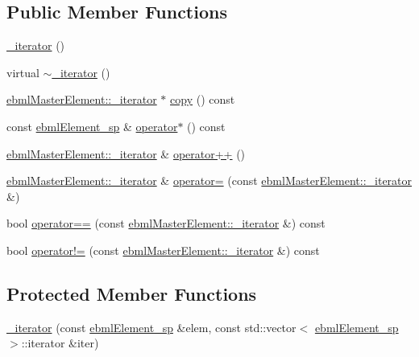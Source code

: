 \subsection*{Public Member Functions}
\begin{DoxyCompactItemize}
\item 
\mbox{\hyperlink{classebml_1_1ebmlList_1_1__iterator_a5a1d3e19e8cc65dd7e298fb289b6eaa2}{\+\_\+iterator}} ()
\item 
virtual \mbox{\hyperlink{classebml_1_1ebmlList_1_1__iterator_ac9b20864cf56e1cf7767153ec53eefc0}{$\sim$\+\_\+iterator}} ()
\item 
\mbox{\hyperlink{classebml_1_1ebmlMasterElement_1_1__iterator}{ebml\+Master\+Element\+::\+\_\+iterator}} $\ast$ \mbox{\hyperlink{classebml_1_1ebmlList_1_1__iterator_a25602ff7d15a50f42d0acba76d38680c}{copy}} () const
\item 
const \mbox{\hyperlink{namespaceebml_adad533b7705a16bb360fe56380c5e7be}{ebml\+Element\+\_\+sp}} \& \mbox{\hyperlink{classebml_1_1ebmlList_1_1__iterator_a2fc500e854171e07d1b0e3ca9ea48fb0}{operator$\ast$}} () const
\item 
\mbox{\hyperlink{classebml_1_1ebmlMasterElement_1_1__iterator}{ebml\+Master\+Element\+::\+\_\+iterator}} \& \mbox{\hyperlink{classebml_1_1ebmlList_1_1__iterator_a48ccc42627bfcc8b681126603232f587}{operator++}} ()
\item 
\mbox{\hyperlink{classebml_1_1ebmlMasterElement_1_1__iterator}{ebml\+Master\+Element\+::\+\_\+iterator}} \& \mbox{\hyperlink{classebml_1_1ebmlList_1_1__iterator_a76134ca4a1212fcf2083fb5f3f6e7130}{operator=}} (const \mbox{\hyperlink{classebml_1_1ebmlMasterElement_1_1__iterator}{ebml\+Master\+Element\+::\+\_\+iterator}} \&)
\item 
bool \mbox{\hyperlink{classebml_1_1ebmlList_1_1__iterator_af451e7598220ae323edd778f4ca3ab21}{operator==}} (const \mbox{\hyperlink{classebml_1_1ebmlMasterElement_1_1__iterator}{ebml\+Master\+Element\+::\+\_\+iterator}} \&) const
\item 
bool \mbox{\hyperlink{classebml_1_1ebmlList_1_1__iterator_af9980e46a983daefa5bd596e88047304}{operator!=}} (const \mbox{\hyperlink{classebml_1_1ebmlMasterElement_1_1__iterator}{ebml\+Master\+Element\+::\+\_\+iterator}} \&) const
\end{DoxyCompactItemize}
\subsection*{Protected Member Functions}
\begin{DoxyCompactItemize}
\item 
\mbox{\hyperlink{classebml_1_1ebmlList_1_1__iterator_a542711e7adecf301995c4e11e08c0b66}{\+\_\+iterator}} (const \mbox{\hyperlink{namespaceebml_adad533b7705a16bb360fe56380c5e7be}{ebml\+Element\+\_\+sp}} \&elem, const std\+::vector$<$ \mbox{\hyperlink{namespaceebml_adad533b7705a16bb360fe56380c5e7be}{ebml\+Element\+\_\+sp}} $>$\+::iterator \&iter)
\end{DoxyCompactItemize}

